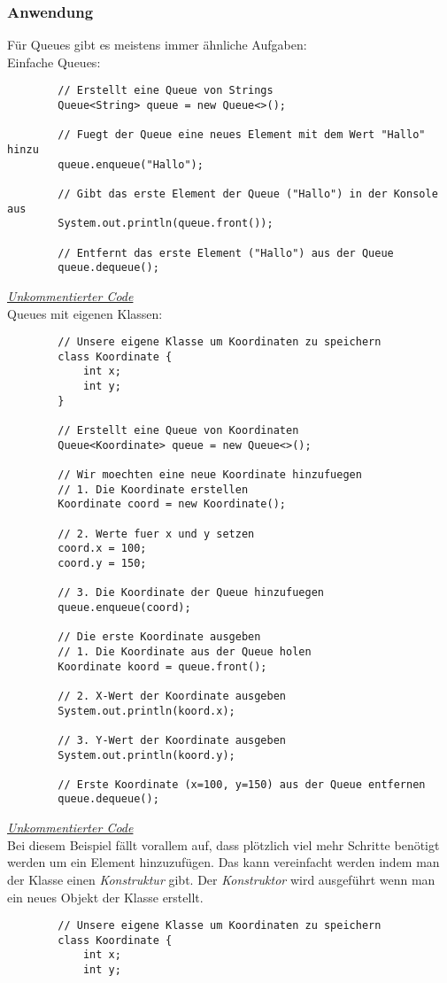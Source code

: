 \subsubsection{Anwendung}
\begin{flushleft}
    Für Queues gibt es meistens immer ähnliche Aufgaben: \\
    Einfache Queues:
    \begin{lstlisting}
        // Erstellt eine Queue von Strings
        Queue<String> queue = new Queue<>();
        
        // Fuegt der Queue eine neues Element mit dem Wert "Hallo" hinzu
        queue.enqueue("Hallo");

        // Gibt das erste Element der Queue ("Hallo") in der Konsole aus
        System.out.println(queue.front());

        // Entfernt das erste Element ("Hallo") aus der Queue
        queue.dequeue();
    \end{lstlisting}
    \href{https://raw.githubusercontent.com/tim-tm/informatik-notes/main/code/Queue_Beispiel1.java}{\textit{Unkommentierter Code}} \\
    Queues mit eigenen Klassen:
    \begin{lstlisting}
        // Unsere eigene Klasse um Koordinaten zu speichern
        class Koordinate {
            int x;
            int y;
        }
        
        // Erstellt eine Queue von Koordinaten
        Queue<Koordinate> queue = new Queue<>();
        
        // Wir moechten eine neue Koordinate hinzufuegen
        // 1. Die Koordinate erstellen
        Koordinate coord = new Koordinate();
        
        // 2. Werte fuer x und y setzen
        coord.x = 100;
        coord.y = 150;

        // 3. Die Koordinate der Queue hinzufuegen
        queue.enqueue(coord);
    
        // Die erste Koordinate ausgeben
        // 1. Die Koordinate aus der Queue holen
        Koordinate koord = queue.front();

        // 2. X-Wert der Koordinate ausgeben
        System.out.println(koord.x);
        
        // 3. Y-Wert der Koordinate ausgeben
        System.out.println(koord.y);

        // Erste Koordinate (x=100, y=150) aus der Queue entfernen
        queue.dequeue();
    \end{lstlisting}
    \href{https://raw.githubusercontent.com/tim-tm/informatik-notes/main/code/Queue_Beispiel2.java}{\textit{Unkommentierter Code}} \\
    Bei diesem Beispiel fällt vorallem auf, dass plötzlich viel mehr Schritte benötigt werden um ein Element hinzuzufügen.
    Das kann vereinfacht werden indem man der Klasse einen \textit{Konstruktur} gibt.
    Der \textit{Konstruktor} wird ausgeführt wenn man ein neues Objekt der Klasse erstellt.
    \begin{lstlisting}
        // Unsere eigene Klasse um Koordinaten zu speichern
        class Koordinate {
            int x;
            int y;
            

\end{lstlisting}
\end{flushleft}
